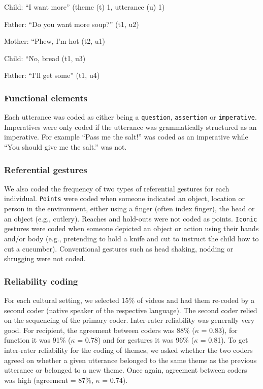 \documentclass[
  man,floatsintext]{apa6}
\begin{document}
Child: ``I want more'' (theme (t) 1, utterance (u) 1)

Father: ``Do you want more soup?'' (t1, u2)

Mother: ``Phew, I'm hot (t2, u1)

Child: ``No, bread (t1, u3)

Father: ``I'll get some'' (t1, u4)

\hypertarget{functional-elements}{%
\subsubsection{Functional elements}\label{functional-elements}}

Each utterance was coded as either being a \texttt{question}, \texttt{assertion} or \texttt{imperative}. Imperatives were only coded if the utterance was grammatically structured as an imperative. For example ``Pass me the salt!'' was coded as an imperative while ``You should give me the salt.'' was not.

\hypertarget{referential-gestures}{%
\subsubsection{Referential gestures}\label{referential-gestures}}

We also coded the frequency of two types of referential gestures for each individual. \texttt{Points} were coded when someone indicated an object, location or person in the environment, either using a finger (often index finger), the head or an object (e.g., cutlery). Reaches and hold-outs were not coded as points. \texttt{Iconic} gestures were coded when someone depicted an object or action using their hands and/or body (e.g., pretending to hold a knife and cut to instruct the child how to cut a cucumber). Conventional gestures such as head shaking, nodding or shrugging were not coded.

\hypertarget{reliability-coding}{%
\subsubsection{Reliability coding}\label{reliability-coding}}

For each cultural setting, we selected 15\% of videos and had them re-coded by a second coder (native speaker of the respective language). The second coder relied on the sequencing of the primary coder. Inter-rater reliability was generally very good. For recipient, the agreement between coders was 88\% (\(\kappa\) = 0.83), for function it was 91\% (\(\kappa\) = 0.78) and for gestures it was 96\% (\(\kappa\) = 0.81). To get inter-rater reliability for the coding of themes, we asked whether the two coders agreed on whether a given utterance belonged to the same theme as the previous utterance or belonged to a new theme. Once again, agreement between coders was high (agreement = 87\%, \(\kappa\) = 0.74).
\end{document}
